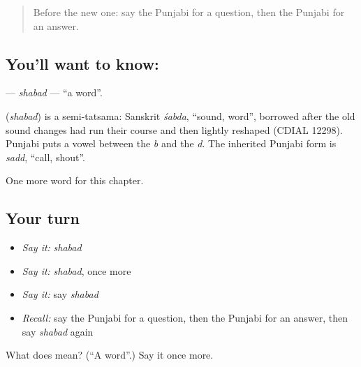 \label{lesson:PA-C72-shabad}



\begin{quote}
Before the new one: say the Punjabi for a question, then the Punjabi for an answer.
\end{quote}

\subsection*{You'll want to know: }
\textbf{} — \emph{shabad} — \textquotedblleft{}a word\textquotedblright{}.

\begin{cousinweb}
\textbf{} (\emph{shabad}) is a semi-tatsama: Sanskrit \emph{śabda}, \textquotedblleft{}sound, word\textquotedblright{}, borrowed after the old sound changes had run their course and then lightly reshaped (CDIAL 12298). Punjabi puts a vowel between the \emph{b} and the \emph{d}. The inherited Punjabi form is \emph{sadd}, \textquotedblleft{}call, shout\textquotedblright{}.
\end{cousinweb}

\begin{grammarlens}[title={What you've built}]
One more word for this chapter.
\end{grammarlens}

\subsection*{Your turn}
\begin{itemize}
\raggedright
  \item \emph{Say it:} \emph{shabad}
  \item \emph{Say it:} \emph{shabad}, once more
  \item \emph{Say it:} say \emph{shabad}
  \item \emph{Recall:} say the Punjabi for a question, then the Punjabi for an answer, then say \emph{shabad} again
\end{itemize}

\begin{tcolorbox}[breakable,colback=teal!4,colframe=teal!35!black,title={Before you move on}]
What does  mean? (\textquotedblleft{}A word\textquotedblright{}.) Say it once more.
\end{tcolorbox}
